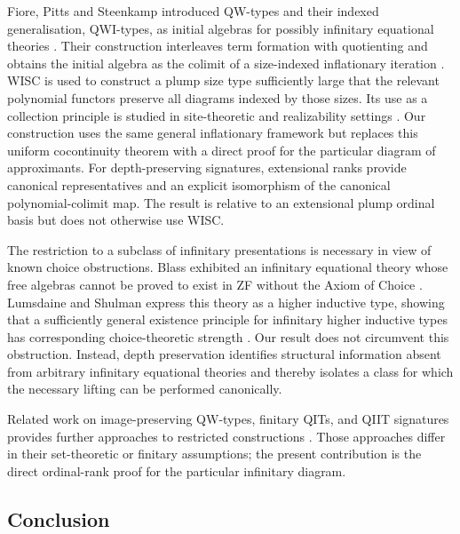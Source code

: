 \documentclass[runningheads]{llncs}
\begin{document}
Fiore, Pitts and Steenkamp introduced QW-types and their indexed
generalisation, QWI-types, as initial algebras for possibly infinitary
equational theories
\citep{fiore2020-infinitary-qiit, fiore2022-quotient-inductive}. Their
construction interleaves term formation with quotienting and obtains the
initial algebra as the colimit of a size-indexed inflationary
iteration \citep{pitts2022-inflationary-iteration}.
WISC is used to construct a plump size type sufficiently large that the
relevant polynomial functors preserve all diagrams indexed by those
sizes. Its use as a collection principle is studied in site-theoretic
and realizability settings
\citep{roberts2012-internal-categories, streicher2005-wisc}. Our
construction uses the same general inflationary framework but replaces
this uniform cocontinuity theorem with a direct proof for the particular
 diagram of approximants. For depth-preserving signatures, extensional
ranks provide canonical representatives and an explicit isomorphism of
the canonical polynomial-colimit map. The result is relative to an
extensional plump ordinal basis but does not otherwise use WISC.

The restriction to a subclass of infinitary presentations is necessary
in view of known choice obstructions. Blass exhibited an infinitary
equational theory whose free algebras cannot be proved to exist in ZF
without the Axiom of Choice \citep{blass1983-free-algebra-coequalizer}.
Lumsdaine and Shulman express this theory as a higher inductive type,
showing that a sufficiently general existence principle for infinitary
higher inductive types has corresponding choice-theoretic strength
\citep[sec.~9]{lumsdaine2019-higher-inductive-types}. Our result does
not circumvent this obstruction. Instead, depth preservation identifies
structural information absent from arbitrary infinitary equational
theories and thereby isolates a class for which the necessary lifting
can be performed canonically.

Related work on image-preserving QW-types, finitary QITs, and QIIT
signatures provides further approaches to restricted constructions
\citep{swan2018-w-types-reductions, swan2022-hits-in-zf,
van-der-weide2019-set-truncated-hits,
kaposi2019-constructing-qiit}. Those approaches differ in their
set-theoretic or finitary assumptions; the present contribution is the
direct ordinal-rank proof for the particular infinitary diagram.

\subsection{Conclusion}\label{conclusion}
\end{document}
